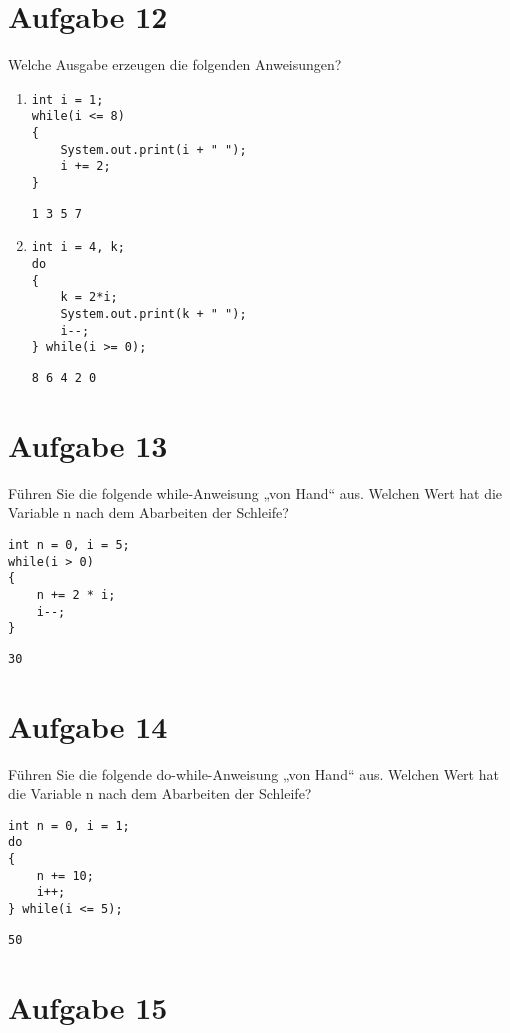 \documentclass[10pt, oneside]{article}
\begin{document}
\section{Aufgabe 12}

Welche Ausgabe erzeugen die folgenden Anweisungen?

\begin{enumerate}
\item
\begin{verbatim}
int i = 1;
while(i <= 8)
{
    System.out.print(i + " ");
    i += 2;
}
\end{verbatim}

\verb|1 3 5 7|

\item
\begin{verbatim}
int i = 4, k;
do
{
    k = 2*i;
    System.out.print(k + " ");
    i--;
} while(i >= 0);
\end{verbatim}

\verb|8 6 4 2 0|
\end{enumerate}

\section{Aufgabe 13}

Führen Sie die folgende while-Anweisung „von Hand“ aus. Welchen Wert hat die
Variable n nach dem Abarbeiten der Schleife?

\begin{verbatim}
int n = 0, i = 5;
while(i > 0)
{
    n += 2 * i;
    i--;
}
\end{verbatim}

\verb|30|

\section{Aufgabe 14}

Führen Sie die folgende do-while-Anweisung „von Hand“ aus. Welchen Wert hat die
Variable n nach dem Abarbeiten der Schleife?

\begin{verbatim}
int n = 0, i = 1;
do
{
    n += 10;
    i++;
} while(i <= 5);
\end{verbatim}

\verb|50|

\section{Aufgabe 15}
\end{document}
